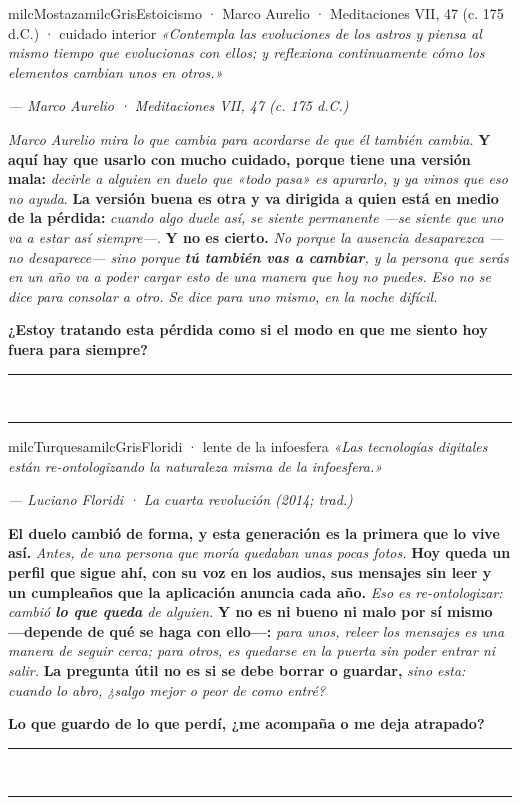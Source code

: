 \documentclass[11pt,letterpaper]{article}
\newcommand{\linead}[1]{\noindent\color{milcLinea}\rule{#1}{0.5pt}\color{milcNegro}}
\begin{document}
\begin{softbox}{milcMostaza}{milcGris}{Estoicismo · Marco Aurelio · Meditaciones VII, 47 (c. 175 d.C.) · cuidado interior}
\textit{«Contempla las evoluciones de los astros y piensa al mismo tiempo que evolucionas con ellos; y reflexiona continuamente cómo los elementos cambian unos en otros.»}

{\footnotesize\itshape\color{milcNegro!70}--- Marco Aurelio · Meditaciones VII, 47 (c. 175 d.C.)}

\emph{Marco Aurelio mira lo que cambia para acordarse de que él también cambia.} \textbf{Y aquí hay que usarlo con mucho cuidado, porque tiene una versión mala:} \emph{decirle a alguien en duelo que «todo pasa» es apurarlo, y ya vimos que eso no ayuda}. \textbf{La versión buena es otra y va dirigida a quien está en medio de la pérdida:} \emph{cuando algo duele así, se siente permanente ---se siente que uno va a estar así siempre---}. \textbf{Y no es cierto.} \emph{No porque la ausencia desaparezca ---no desaparece--- sino porque \textbf{tú también vas a cambiar}, y la persona que serás en un año va a poder cargar esto de una manera que hoy no puedes.} \emph{Eso no se dice para consolar a otro. Se dice para uno mismo, en la noche difícil.}

\textbf{¿Estoy tratando esta pérdida como si el modo en que me siento hoy fuera para siempre?}
\end{softbox}
\linead{\linewidth}\\[1mm]
\linead{\linewidth}

\begin{softbox}{milcTurquesa}{milcGris}{Floridi · lente de la infoesfera}
\textit{«Las tecnologías digitales están re-ontologizando la naturaleza misma de la infoesfera.»}

{\footnotesize\itshape\color{milcNegro!70}--- Luciano Floridi · La cuarta revolución (2014; trad.)}

\textbf{El duelo cambió de forma, y esta generación es la primera que lo vive así.} \emph{Antes, de una persona que moría quedaban unas pocas fotos.} \textbf{Hoy queda un perfil que sigue ahí, con su voz en los audios, sus mensajes sin leer y un cumpleaños que la aplicación anuncia cada año.} \emph{Eso es re-ontologizar: cambió \textbf{lo que queda} de alguien.} \textbf{Y no es ni bueno ni malo por sí mismo ---depende de qué se haga con ello---:} \emph{para unos, releer los mensajes es una manera de seguir cerca; para otros, es quedarse en la puerta sin poder entrar ni salir.} \textbf{La pregunta útil no es si se debe borrar o guardar,} \emph{sino esta: cuando lo abro, ¿salgo mejor o peor de como entré?}

\textbf{Lo que guardo de lo que perdí, ¿me acompaña o me deja atrapado?}
\end{softbox}
\linead{\linewidth}\\[1mm]
\linead{\linewidth}
\end{document}
